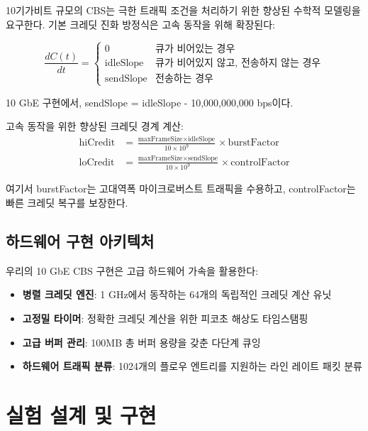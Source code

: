 \documentclass[12pt, a4paper]{article}
\begin{document}
10기가비트 규모의 CBS는 극한 트래픽 조건을 처리하기 위한 향상된 수학적 모델링을 요구한다. 기본 크레딧 진화 방정식은 고속 동작을 위해 확장된다:

\begin{equation}
\frac{dC(t)}{dt} = \begin{cases}
0 & \text{큐가 비어있는 경우} \\
\text{idleSlope} & \text{큐가 비어있지 않고, 전송하지 않는 경우} \\
\text{sendSlope} & \text{전송하는 경우}
\end{cases}
\end{equation}

10 GbE 구현에서, sendSlope = idleSlope - 10,000,000,000 bps이다.

고속 동작을 위한 향상된 크레딧 경계 계산:
\begin{align}
\text{hiCredit} &= \frac{\text{maxFrameSize} \times \text{idleSlope}}{10 \times 10^9} \times \text{burstFactor} \\
\text{loCredit} &= \frac{\text{maxFrameSize} \times \text{sendSlope}}{10 \times 10^9} \times \text{controlFactor}
\end{align}

여기서 burstFactor는 고대역폭 마이크로버스트 트래픽을 수용하고, controlFactor는 빠른 크레딧 복구를 보장한다.

\subsection{하드웨어 구현 아키텍처}

우리의 10 GbE CBS 구현은 고급 하드웨어 가속을 활용한다:

\begin{itemize}
    \item \textbf{병렬 크레딧 엔진}: 1 GHz에서 동작하는 64개의 독립적인 크레딧 계산 유닛
    \item \textbf{고정밀 타이머}: 정확한 크레딧 계산을 위한 피코초 해상도 타임스탬핑
    \item \textbf{고급 버퍼 관리}: 100MB 총 버퍼 용량을 갖춘 다단계 큐잉
    \item \textbf{하드웨어 트래픽 분류}: 1024개의 플로우 엔트리를 지원하는 라인 레이트 패킷 분류
\end{itemize}

\section{실험 설계 및 구현}
\end{document}
